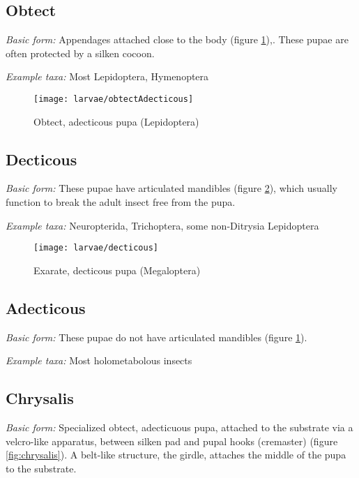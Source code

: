 \subsection{Obtect}%
\noindent{}\textit{Basic form:} Appendages attached close to the body (figure \ref{fig:obtectAdecticous}),. These pupae are often protected by a silken cocoon.\vspace{3mm}

\noindent{}\textit{Example taxa:} Most Lepidoptera, Hymenoptera\vspace{3mm}

\begin{figure}[ht!]
  \centering
    \texttt{[image: larvae/obtectAdecticous]}
  \caption{Obtect, adecticous pupa (Lepidoptera) \citep[modified from][Fig. 6C]{bhlitem190298gelechiid}}
  \label{fig:obtectAdecticous}
\end{figure}

\subsection{Decticous}
\noindent{}\textit{Basic form:} These pupae have articulated mandibles (figure \ref{fig:decticous}), which usually function to break the adult insect free from the pupa.\vspace{3mm}

\noindent{}\textit{Example taxa:} Neuropterida, Trichoptera, some non-Ditrysia Lepidoptera\vspace{3mm}

\begin{figure}[ht!]
  \centering
    \texttt{[image: larvae/decticous]}
  \caption{Exarate, decticous pupa (Megaloptera) \citep[modified from][Fig. 56b]{walsh2004hellgrammite}}
  \label{fig:decticous}
\end{figure}

\subsection{Adecticous}
\noindent{}\textit{Basic form:} These pupae do not have articulated mandibles (figure \ref{fig:obtectAdecticous}).\vspace{3mm}

\noindent{}\textit{Example taxa:} Most holometabolous insects\vspace{3mm}

\subsection{Chrysalis}%
\noindent{}\textit{Basic form:} Specialized obtect, adecticuous pupa, attached to the substrate via a velcro-like apparatus, between silken pad and pupal hooks (cremaster) (figure \ref{fig:chrysalis}). A belt-like structure, the girdle, attaches the middle of the pupa to the substrate.\vspace{3mm}

